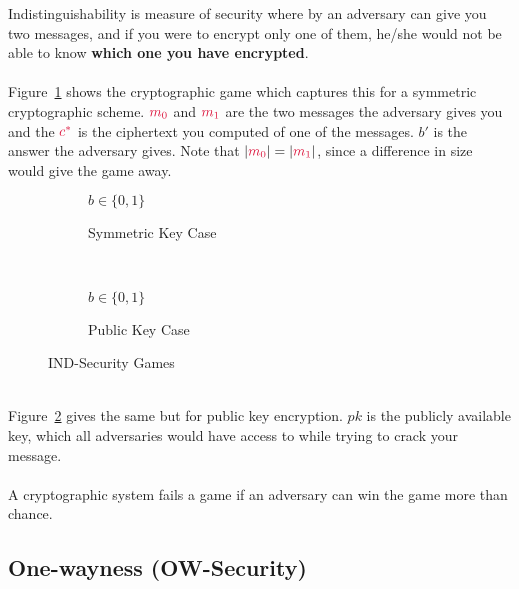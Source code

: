 Indistinguishability is measure of security where by an adversary can give you two messages, and if you were to encrypt only one of them, he/she would not be able to know \textbf{which one you have encrypted}.\\
\\
Figure~\ref{fig:ind-sec-sym} shows the cryptographic game which captures this for a symmetric cryptographic scheme. $\csubm{0}$ and $\csubm{1}$ are the two messages the adversary gives you and the $\ccast$ is the ciphertext you computed of one of the messages. $b'$ is the answer the adversary gives. Note that $|\csubm{0}|=|\csubm{1}|$, since a difference in size would give the game away.\\
\begin{figure}[htp!]
    \centering
    \begin{subfigure}[b]{0.4\textwidth}
        \centering
        \begin{cryptogame}{$b\in \{0,1\}$}
        \end{cryptogame}
        \caption{Symmetric Key  Case}
        \label{fig:ind-sec-sym}
    \end{subfigure}
    ~
    \begin{subfigure}[b]{0.4\textwidth}
        \centering
        \begin{cryptogame}{$b\in \{0,1\}$}
            \cgameright{$\cpk$}
        \end{cryptogame}
        \caption{Public Key Case}
        \label{fig:ind-sec-pub}
    \end{subfigure}
    \caption{IND-Security Games}
    \label{fig:ind-sec}
\end{figure}
\\
Figure~\ref{fig:ind-sec-pub} gives the same but for public key encryption. $pk$ is the publicly available key, which all adversaries would have access to while trying to crack your message.\\
\\
A cryptographic system fails a game if an adversary can win the game more than chance.

\subsection{One-wayness (OW-Security)}

